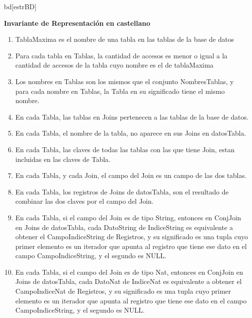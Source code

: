 \begin{Representacion}
	\begin{Estructura}{bd}[estrBD]
    	\begin{Tupla}[estrBD]
        \end{Tupla}
	\end{Estructura}
    
    
\textbf{Invariante de Representaci\'on en castellano}

	\begin{enumerate}
		\item TablaMaxima es el nombre de una tabla en las tablas de la base de datos
        \item Para cada tabla en Tablas, la cantidad de accesos es menor o igual a la cantidad de accesos de la tabla cuyo nombre es el de tablaMaxima
        \item Los nombres en Tablas son los mismos que el conjunto NombresTablas, y para cada nombre en Tablas, la Tabla en su significado tiene el mismo nombre.
        \item En cada Tabla, las tablas en Joins pertenecen a las tablas de la base de datos.
		\item En cada Tabla, el nombre de la tabla, no aparece en sus Joins en datosTabla.
        \item En cada Tabla, las claves de todas las tablas con las que tiene Join, estan incluidas en las claves de Tabla.
        \item En cada Tabla, y cada Join, el campo del Join es un campo de las dos tablas.
        \item En cada Tabla, los registros de Joins de datosTabla, son el resultado de combinar las dos claves por el campo del Join.
        \item En cada Tabla, si el campo del Join es de tipo String, entonces en ConjJoin en Joins de datosTabla, cada DatoString de IndiceString es equivalente a obtener el CampoIndiceString de Registros, y su significado es una tupla cuyo primer elemento es un iterador que apunta al registro que tiene ese dato en el campo CampoIndiceString, y el segundo es NULL.
        \item En cada Tabla, si el campo del Join es de tipo Nat, entonces en ConjJoin en Joins de datosTabla, cada DatoNat de IndiceNat es equivalente a obtener el CampoIndiceNat de Registros, y su significado es una tupla cuyo primer elemento es un iterador que apunta al registro que tiene ese dato en el campo CampoIndiceString, y el segundo es NULL.
	\end{enumerate}
    

\end{Representacion}

